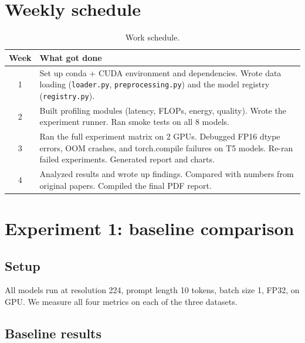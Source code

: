 \documentclass[12pt,a4paper]{article}
\begin{document}
\section{Weekly schedule}
\label{sec:schedule}

\begin{table}[H]
\centering
\caption{Work schedule.}
\begin{tabular}{@{}cp{10cm}@{}}
\toprule
Week & What got done \\
\midrule
1 &
  Set up conda + CUDA environment and dependencies.
  Wrote data loading (\texttt{loader.py}, \texttt{preprocessing.py}) and the model registry (\texttt{registry.py}). \\
\midrule
2 &
  Built profiling modules (latency, FLOPs, energy, quality).
  Wrote the experiment runner.
  Ran smoke tests on all 8 models. \\
\midrule
3 &
  Ran the full experiment matrix on 2 GPUs.
  Debugged FP16 dtype errors, OOM crashes, and torch.compile failures on T5 models.
  Re-ran failed experiments.
  Generated report and charts. \\
\midrule
4 &
  Analyzed results and wrote up findings.
  Compared with numbers from original papers.
  Compiled the final PDF report. \\
\bottomrule
\end{tabular}
\end{table}

\section{Experiment 1: baseline comparison}
\label{sec:experiment1}

\subsection{Setup}

All models run at resolution 224, prompt length 10 tokens, batch size 1, FP32, on GPU.  We measure all four metrics on each of the three datasets.

\subsection{Baseline results}
\end{document}

